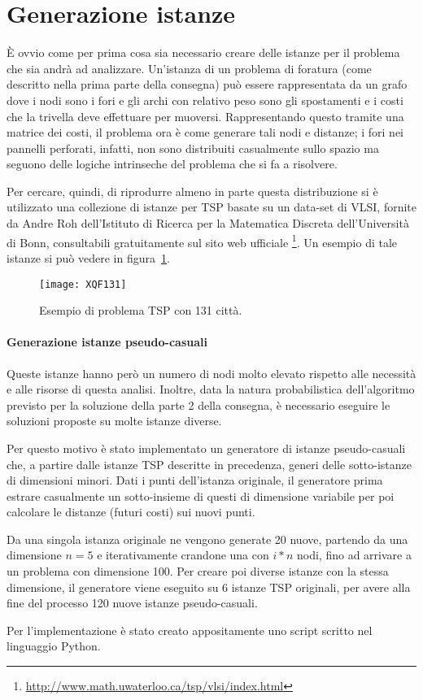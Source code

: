 
\section{Generazione istanze}\label{sec:generazione-istanze}
È ovvio come per prima cosa sia necessario creare delle istanze per il problema che sia andrà ad analizzare.
Un'istanza di un problema di foratura (come descritto nella prima parte della consegna) può essere rappresentata
da un grafo dove i nodi sono i fori e gli archi con relativo peso sono gli spostamenti e i costi che la trivella
deve effettuare per muoversi.
Rappresentando questo tramite una matrice dei costi, il problema ora è come generare tali nodi e distanze;
i fori nei pannelli perforati, infatti, non sono distribuiti casualmente sullo spazio ma seguono delle
logiche intrinseche del problema che si fa a risolvere.

Per cercare, quindi, di riprodurre almeno in parte questa distribuzione si è utilizzato una collezione di istanze
per TSP basate su un data-set di VLSI, fornite da Andre Roh dell'Istituto di Ricerca per la Matematica Discreta
dell'Università di Bonn, consultabili gratuitamente sul sito web ufficiale
\footnote{\url{http://www.math.uwaterloo.ca/tsp/vlsi/index.html}}.
Un esempio di tale istanze si può vedere in figura~\ref{fig:istanza-tsp-XQF131}.
%
\begin{figure}[!h]
\begin{center}
	\texttt{[image: XQF131]}
{\scriptsize \caption{Esempio di problema TSP con 131 città.}
\label{fig:istanza-tsp-XQF131}}
\end{center}
\end{figure}
%
\paragraph{Generazione istanze pseudo-casuali}
Queste istanze hanno però un numero di nodi molto elevato rispetto alle necessità
e alle risorse di questa analisi.
Inoltre, data la natura probabilistica dell'algoritmo previsto per la soluzione della parte 2 della consegna,
è necessario eseguire le soluzioni proposte su molte istanze diverse.

Per questo motivo è stato implementato un generatore di istanze pseudo-casuali che, a partire dalle istanze TSP
descritte in precedenza, generi delle sotto-istanze di dimensioni minori.
Dati i punti dell'istanza originale, il generatore prima estrare casualmente un sotto-insieme di questi
di dimensione variabile per poi calcolare le distanze (futuri costi) sui nuovi punti.

Da una singola istanza originale ne vengono generate 20 nuove, partendo da una dimensione $n=5$ e iterativamente
crandone una con $i*n$ nodi, fino ad arrivare a un problema con dimensione 100.
Per creare poi diverse istanze con la stessa dimensione, il generatore viene eseguito su 6 istanze TSP originali,
per avere alla fine del processo 120 nuove istanze pseudo-casuali.

Per l'implementazione è stato creato appositamente uno script scritto nel linguaggio Python.

